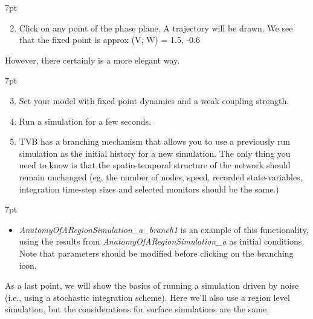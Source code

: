 \documentclass{tufte-handout}
\newenvironment{simulation}{%
  \def\FrameCommand{%
    \hspace{1pt}%
    {\color{ForestGreen}\vrule width 2pt}%
    {\color{simulationshade}\vrule width 4pt}%
    \colorbox{simulationshade}%
  }%
  \MakeFramed{\advance\hsize-\width\FrameRestore}%
  \noindent\hspace{-4.55pt}%
  \begin{adjustwidth}{}{7pt}%
  \vspace{2pt}\vspace{2pt}%
}
{%
  \vspace{2pt}\end{adjustwidth}\endMakeFramed%
}
\begin{document}
\begin{simulation}
\begin{enumerate}[resume]
  \setcounter{enumi}{1}
\item  Click on any point of the phase plane. A trajectory will be drawn.
We see that the fixed point is approx (V, W) = 1.5, -0.6
\end{enumerate}
\end{simulation}


However, there certainly is a more elegant way. 

\begin{simulation}
\begin{enumerate}[resume]
  \setcounter{enumi}{2}
\item Set your model with fixed point dynamics and a weak coupling strength.
\item Run a simulation for a few seconds.
\item TVB has a branching mechanism that allows you to use a previously run
simulation as the initial history for a new simulation. The only thing you
need to know is that the spatio-temporal structure of the network should
remain unchanged (eg, the number of nodes, speed, recorded state-variables,
integration time-step sizes and selected monitors should be the same.)
\end{enumerate}
\end{simulation}

\begin{simulation}
\begin{itemize}
 \item \textit{AnatomyOfARegionSimulation\_a\_branch1} is an example of this functionality, using the results from \textit{AnatomyOfARegionSimulation\_a} as initial conditions. Note that parameters should be modified before clicking on the branching icon.
\end{itemize}
\end{simulation}



As a last point, we will  show the basics of running a simulation driven by
noise (i.e., using a stochastic integration scheme). Here we'll also use a region
level simulation, but the considerations for surface simulations are the same.
\end{document}
